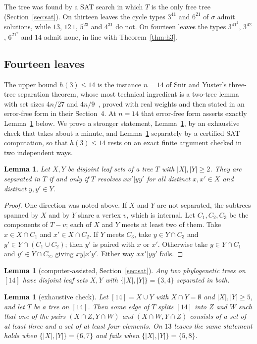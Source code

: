 \documentclass[11pt]{amsart}
\newtheorem{lemma}[theorem]{Lemma}
\theoremstyle{remark}
\begin{document}
The tree was found by a SAT search in which $T$ is the only free tree (Section~\ref{sec:sat}). On thirteen leaves the cycle types $3^41$ and $6^21$ of $\sigma$ admit solutions, while $13$, $12\,1$, $5^23$ and $4^31$ do not. On fourteen leaves the types $3^41^2$, $3^42$, $6^21^2$ and $14$ admit none, in line with Theorem~\ref{thm:h3}.

\subsection*{Fourteen leaves}
The upper bound $h(3)\le14$ is the instance $n=14$ of Snir and Yuster's three-tree separation theorem, whose most technical ingredient is a two-tree lemma with set sizes $4n/27$ and $4n/9$~\cite[Lemma~2.6]{SY2026}, proved with real weights and then stated in an error-free form in their Section~4. At $n=14$ that error-free form asserts exactly Lemma~\ref{lem:two} below. We prove a stronger statement, Lemma~\ref{lem:bip}, by an exhaustive check that takes about a minute, and Lemma~\ref{lem:two} separately by a certified SAT computation, so that $h(3)\le14$ rests on an exact finite argument checked in two independent ways.

\begin{lemma}\label{lem:quartetsep}
Let $X,Y$ be disjoint leaf sets of a tree $T$ with $|X|,|Y|\ge2$. They are separated in $T$ if and only if $T$ resolves $xx'|yy'$ for all distinct $x,x'\in X$ and distinct $y,y'\in Y$.
\end{lemma}

\begin{proof}
One direction was noted above. If $X$ and $Y$ are not separated, the subtrees spanned by $X$ and by $Y$ share a vertex $v$, which is internal. Let $C_1,C_2,C_3$ be the components of $T-v$; each of $X$ and $Y$ meets at least two of them. Take $x\in X\cap C_1$ and $x'\in X\cap C_2$. If $Y$ meets $C_3$, take $y\in Y\cap C_3$ and $y'\in Y\cap(C_1\cup C_2)$; then $y'$ is paired with $x$ or $x'$. Otherwise take $y\in Y\cap C_1$ and $y'\in Y\cap C_2$, giving $xy|x'y'$. Either way $xx'|yy'$ fails.
\end{proof}

\begin{lemma}[computer-assisted, Section~\ref{sec:sat}]\label{lem:two}
Any two phylogenetic trees on $[14]$ have disjoint leaf sets $X,Y$ with $\{|X|,|Y|\}=\{3,4\}$ separated in both.
\end{lemma}

\begin{lemma}[exhaustive check]\label{lem:bip}
Let $[14]=X\cup Y$ with $X\cap Y=\emptyset$ and $|X|,|Y|\ge5$, and let $T$ be a tree on $[14]$. Then some edge of $T$ splits $[14]$ into $Z$ and $W$ such that one of the pairs $(X\cap Z,Y\cap W)$ and $(X\cap W,Y\cap Z)$ consists of a set of at least three and a set of at least four elements. On $13$ leaves the same statement holds when $\{|X|,|Y|\}=\{6,7\}$ and fails when $\{|X|,|Y|\}=\{5,8\}$.
\end{lemma}
\end{document}

